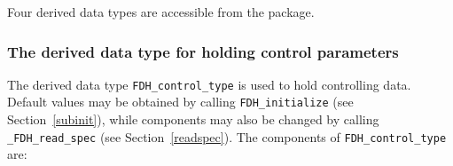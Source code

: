 \documentclass{galahad}
\newcommand{\packagename}{FDH}
\newcommand{\fullpackagename}{\libraryname\_\packagename}
\begin{document}




\galtypes
Four derived data types are accessible from the package.


\subsubsection{The derived data type for holding control 
 parameters}\label{typecontrol}
The derived data type 
{\tt \packagename\_control\_type} 
is used to hold controlling data. Default values may be obtained by calling 
{\tt \packagename\_initialize}
(see Section~\ref{subinit}),
while components may also be changed by calling 
{\tt \fullpackagename\_read\-\_spec}
(see Section~\ref{readspec}). 
The components of 
{\tt \packagename\_control\_type} 
are:
\end{document}
